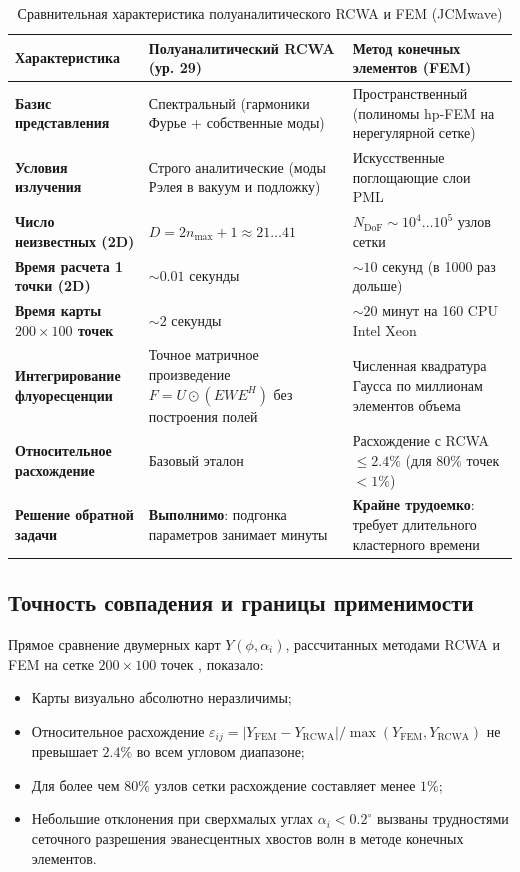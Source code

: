\documentclass[a4paper,11pt]{article}
\begin{document}
\begin{table}[htbp]
\centering
\small
\caption{Сравнительная характеристика полуаналитического RCWA и FEM (JCMwave)}
\label{tab:comparison_expanded}
\begin{tabularx}{\textwidth}{p{4.2cm} X X}
\toprule
\textbf{Характеристика} & \textbf{Полуаналитический RCWA (ур. 29)} & \textbf{Метод конечных элементов (FEM)} \\
\midrule
\textbf{Базис представления} & Спектральный (гармоники Фурье + собственные моды) & Пространственный (полиномы hp-FEM на нерегулярной сетке) \\
\addlinespace
\textbf{Условия излучения} & Строго аналитические (моды Рэлея в вакуум и подложку) & Искусственные поглощающие слои PML \\
\addlinespace
\textbf{Число неизвестных (2D)} & $D = 2n_{\max} + 1 \approx 21\dots 41$ & $N_{\text{DoF}} \sim 10^4\dots 10^5$ узлов сетки \\
\addlinespace
\textbf{Время расчета 1 точки (2D)} & $\sim 0.01$ секунды & $\sim 10$ секунд (в 1000 раз дольше) \\
\addlinespace
\textbf{Время карты $200 \times 100$ точек} & $\sim 2$ секунды & $\sim 20$ минут на 160 CPU Intel Xeon \\
\addlinespace
\textbf{Интегрирование флуоресценции} & Точное матричное произведение $F = U \odot (E W E^H)$ без построения полей & Численная квадратура Гаусса по миллионам элементов объема \\
\addlinespace
\textbf{Относительное расхождение} & Базовый эталон & Расхождение с RCWA $\le 2.4\%$ (для $80\%$ точек $< 1\%$) \\
\addlinespace
\textbf{Решение обратной задачи} & \textbf{Выполнимо}: подгонка параметров занимает минуты & \textbf{Крайне трудоемко}: требует длительного кластерного времени \\
\bottomrule
\end{tabularx}
\end{table}

\subsection{Точность совпадения и границы применимости}

Прямое сравнение двумерных карт $Y(\phi, \alpha_i)$, рассчитанных методами RCWA и FEM на сетке $200 \times 100$ точек \cite{nikolaev2020}, показало:
\begin{itemize}
    \item Карты визуально абсолютно неразличимы;
    \item Относительное расхождение $\varepsilon_{ij} = |Y_{\text{FEM}} - Y_{\text{RCWA}}| / \max(Y_{\text{FEM}}, Y_{\text{RCWA}})$ не превышает $2.4\%$ во всем угловом диапазоне;
    \item Для более чем $80\%$ узлов сетки расхождение составляет менее $1\%$;
    \item Небольшие отклонения при сверхмалых углах $\alpha_i < 0.2^\circ$ вызваны трудностями сеточного разрешения эванесцентных хвостов волн в методе конечных элементов.
\end{itemize}
\end{document}
